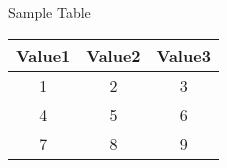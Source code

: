 \begin{center}
    \caption{Sample Table}
    \begin{tabular}{|c|c|c|}
        \hline 
        Value1 & Value2 & Value3 \\ 
        \hline 
        1 & 2 & 3 \\
        4 & 5 & 6 \\
        7 & 8 & 9 \\
        \hline
    \end{tabular}
\end{center}